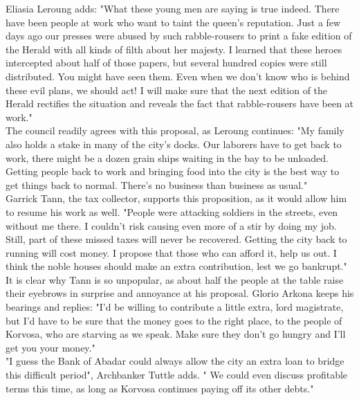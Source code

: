 Eliasia Leroung adds: "What these young men are saying is true indeed. There have been people at work who want to taint the queen's reputation. Just a few days ago our presses were abused by such rabble-rousers to print a fake edition of the Herald with all kinds of filth about her majesty. I learned that these heroes intercepted about half of those papers, but several hundred copies were still distributed. You might have seen them. Even when we don't know who is behind these evil plans, we should act! I will make sure that the next edition of the Herald rectifies the situation and reveals the fact that rabble-rousers have been at work."\\

The council readily agrees with this proposal, as Leroung continues: "My family also holds a stake in many of the city's docks. Our laborers have to get back to work, there might be a dozen grain ships waiting in the bay to be unloaded. Getting people back to work and bringing food into the city is the best way to get things back to normal. There's no business than business as usual."\\

Garrick Tann, the tax collector, supports this proposition, as it would allow him to resume his work as well. "People were attacking soldiers in the streets, even without me there. I couldn't risk causing even more of a stir by doing my job. Still, part of these missed taxes will never be recovered. Getting the city back to running will cost money. I propose that those who can afford it, help us out. I think the noble houses should make an extra contribution, lest we go bankrupt."\\

It is clear why Tann is so unpopular, as about half the people at the table raise their eyebrows in surprise and annoyance at his proposal. Glorio Arkona keeps his bearings and replies: "I'd be willing to contribute a little extra, lord magistrate, but I'd have to be sure that the money goes to the right place, to the people of Korvosa, who are starving as we speak. Make sure they don't go hungry and I'll get you your money."\\

"I guess the Bank of Abadar could always allow the city an extra loan to bridge this difficult period", Archbanker Tuttle adds. " We could even discuss profitable terms this time, as long as Korvosa continues paying off its other debts."\\

